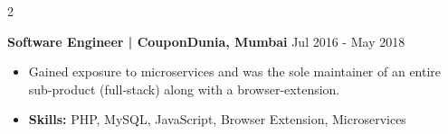 \documentclass[a4paper,10pt]{article}
\newcommand{\experience}[2]{
  \vspace{0.8em}%
  \textbf{#1} \hfill #2
}
\begin{document}
\begin{paracol}{2}
\experience{Software Engineer | CouponDunia, Mumbai}{Jul 2016 - May 2018}
\vspace{0.2em}
\begin{itemize}
\setlength{\leftskip}{1em}
    \item Gained exposure to microservices and was the sole maintainer of an entire sub-product (full-stack) along with a browser-extension.
    \item \textbf{Skills:} PHP, MySQL, JavaScript, Browser Extension, Microservices
\end{itemize}

\end{paracol}
\end{document}
